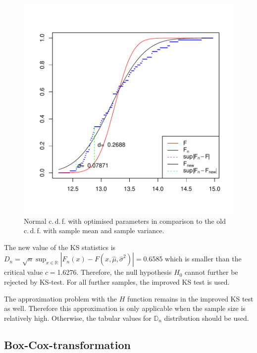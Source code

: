 \documentclass[a4paper, 12pt, titlepage, headsepline, listof = totoc, bibliography = totoc, numbers = noenddot]{scrartcl}
\newcommand{\cdf}{c.\,d.\,f. }
\begin{document}
\begin{figure}[H]
\includegraphics[width=\textwidth]{report-improvedKS}
\caption{Normal \cdf with optimised parameters in comparison to the old \cdf
with sample mean and sample variance.}
\label{fig:improvedKS}
\end{figure}

The new value of the KS statistics is $D_n=\sqrt{n}\sup_{x \in
\mathbb{R}}|F_n(x)-F(x,\hat{\mu},\hat{\sigma}^2)|=$0.6585
which is smaller than the critical value $c=$1.6276. Therefore, the null
hypothesis $H_0$ cannot further be rejected by KS-test. For all further samples, the improved KS
test is used. 


The approximation problem with the $H$ function remains in the improved KS test
as well. Therefore this approximation is only applicable when 
the sample size is relatively high. Otherwise, the tabular values for
$\mathbb{D}_n$ distribution should be used. 



\subsection{Box-Cox-transformation}\label{sec:boxcox-theory}
\end{document}
